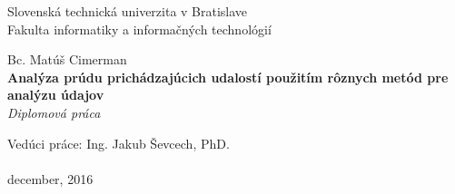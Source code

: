 \documentclass[12pt, a4paper, titlepage, slovak]{book}
\begin{document}
\sloppy %




\frontmatter

\begin{titlepage}
\begin{center}                                                                                                                                                   
{\Large Slovenská technická univerzita v Bratislave} \\
{\Large Fakulta informatiky a informačných technológií} \\
\vspace*{1\baselineskip}
\large {}
\vfill %


{{Bc. Matúš Cimerman}} \\
\vspace*{1\baselineskip}
{\LARGE {\textbf{Analýza prúdu prichádzajúcich udalostí použitím rôznych metód pre analýzu údajov}}} %
\\
\vspace*{1\baselineskip}
\textit{Diplomová práca}\\
\vfill %
\end{center}
{Vedúci práce: Ing. Jakub Ševcech, PhD.}\\
\\
{december, 2016}
\end{titlepage}
\emptydoublepage
\end{document}
